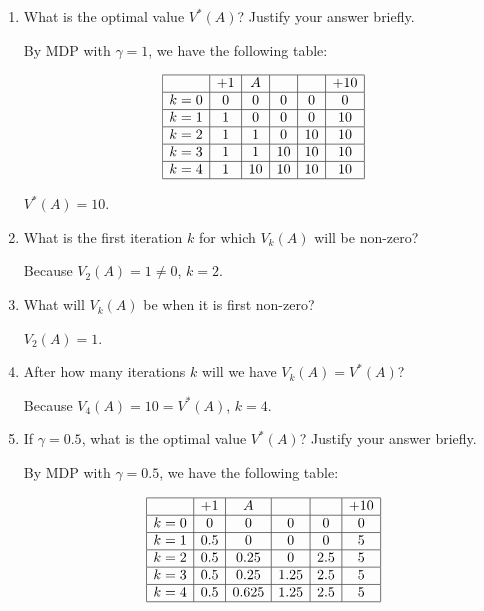 \documentclass{article}
\begin{document}
\begin{enumerate}[label=(\alph*)]
    \item What is the optimal value $V^*(A)$? Justify your answer briefly.

    By MDP with $\gamma = 1$, we have the following table:

    $$
    \begin{array}{|l|c|c|c|c|c|}
        \hline
              & +1 &  A &    &    & +10 \\
        \hline
        k = 0 &  0 &  0 &  0 &  0 &   0 \\
        \hline
        k = 1 &  1 &  0 &  0 &  0 &  10 \\
        \hline
        k = 2 &  1 &  1 &  0 & 10 &  10 \\
        \hline
        k = 3 &  1 &  1 & 10 & 10 &  10 \\
        \hline
        k = 4 &  1 & 10 & 10 & 10 &  10 \\
        \hline
    \end{array}
    $$

    $V^*(A) = 10$.

    \item What is the first iteration $k$ for which $V_k(A)$ will be non-zero?

    Because $V_2(A) = 1 \ne 0$, $k = 2$.
    \item What will $V_k(A)$ be when it is first non-zero?

    $V_2(A) = 1$.

    \item After how many iterations $k$ will we have $V_k(A) = V^*(A)$?

    Because $V_4(A) = 10 = V^*(A)$, $k = 4$.

    \item If $\gamma = 0.5$, what is the optimal value $V^*(A)$? Justify your answer briefly.

    By MDP with $\gamma = 0.5$, we have the following table:

    $$
    \begin{array}{|l|c|c|c|c|c|}
        \hline
              & +1  &     A &      &     & +10 \\
        \hline
        k = 0 &   0 &     0 &    0 &   0 & 0 \\
        \hline
        k = 1 & 0.5 &     0 &    0 &   0 & 5 \\
        \hline
        k = 2 & 0.5 &  0.25 &    0 & 2.5 & 5 \\
        \hline
        k = 3 & 0.5 &  0.25 & 1.25 & 2.5 & 5 \\
        \hline
        k = 4 & 0.5 & 0.625 & 1.25 & 2.5 & 5 \\
        \hline
    \end{array}
    $$


\end{enumerate}
\end{document}
